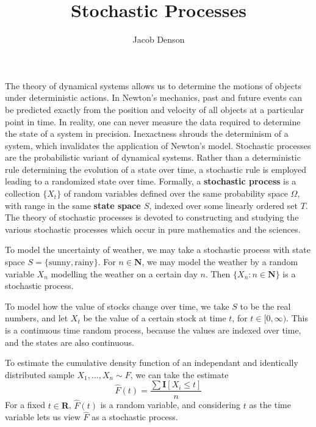 

\title{Stochastic Processes}
\author{Jacob Denson}



\maketitle
\tableofcontents

\newpage


The theory of dynamical systems allows us to determine the motions of objects under deterministic actions. In Newton's mechanics, past and future events can be predicted exactly from the position and velocity of all objects at a particular point in time. In reality, one can never measure the data required to determine the state of a system in precision. Inexactness shrouds the determinism of a system, which invalidates the application of Newton's model. Stochastic processes are the probabilistic variant of dynamical systems. Rather than a deterministic rule determining the evolution of a state over time, a stochastic rule is employed leading to a randomized state over time. Formally, a {\bf stochastic process} is a collection $\{ X_t \}$ of random variables defined over the same probability space $\Omega$, with range in the same {\bf state space $S$}, indexed over some linearly ordered set $T$. The theory of stochastic processes is devoted to constructing and studying the various stochastic processes which occur in pure mathematics and the sciences.

\begin{example}
    To model the uncertainty of weather, we may take a stochastic process with state space $S = \{ \text{sunny}, \text{rainy} \}$. For $n \in \mathbf{N}$, we may model the weather by a random variable $X_n$ modelling the weather on a certain day $n$. Then $\{ X_n : n \in \mathbf{N} \}$ is a stochastic process.
\end{example}

\begin{example}
    To model how the value of stocks change over time, we take $S$ to be the real numbers, and let $X_t$ be the value of a certain stock at time $t$, for $t \in [0,\infty)$. This is a continuous time random process, because the values are indexed over time, and the states are also continuous.
\end{example}

\begin{example}
    To estimate the cumulative density function of an independant and identically distributed sample $X_1, \dots, X_n \sim F$, we can take the estimate
    \[ \widehat{F}(t) = \frac{\sum \mathbf{I}[X_i \leq t]}{n} \]
    For a fixed $t \in \mathbf{R}$, $\hat{F}(t)$ is a random variable, and considering $t$ as the time variable lets us view $\hat{F}$ as a stochastic process.
\end{example}

